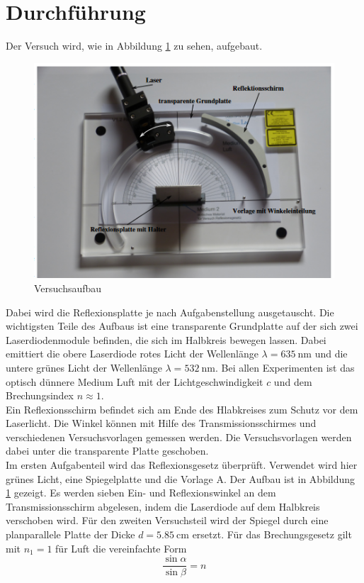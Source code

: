 \section{Durchführung}
\label{sec:Durchführung}
Der Versuch wird, wie in Abbildung \ref{fig:aufb} zu sehen, aufgebaut.
\begin{figure}
    \centering
    \caption{Versuchsaufbau \cite{V400}}
    \label{fig:aufb}
    \includegraphics[width = 0.6 \textwidth]{pics/aufb.png}
\end{figure}
Dabei wird die Reflexionsplatte je nach Aufgabenstellung ausgetauscht.
Die wichtigsten Teile des Aufbaus ist eine transparente Grundplatte auf der sich zwei Laserdiodenmodule befinden, die sich im Halbkreis bewegen lassen.
Dabei emittiert die obere Laserdiode rotes Licht der Wellenlänge $\lambda = \SI{635}{\nano \meter}$ und die untere grünes Licht der Wellenlänge $\lambda=\SI{532}{\nano \meter}$.
Bei allen Experimenten ist das optisch dünnere Medium Luft mit der Lichtgeschwindigkeit $c$ und dem Brechungsindex $n \approx 1$.\\
Ein Reflexionsschirm befindet sich am Ende des Hlabkreises zum Schutz vor dem Laserlicht. Die Winkel können mit Hilfe des Transmissionsschirmes und verschiedenen Versuchsvorlagen gemessen werden.
Die Versuchsvorlagen werden dabei unter die transparente Platte geschoben.\\
Im ersten Aufgabenteil wird das Reflexionsgesetz überprüft. Verwendet wird hier grünes Licht, eine Spiegelplatte und die Vorlage A.
Der Aufbau ist in Abbildung \ref{fig:aufb} gezeigt. Es werden sieben Ein- und Reflexionswinkel an dem Transmissionsschirm abgelesen, indem die Laserdiode auf dem Halbkreis verschoben wird.
Für den zweiten Versuchsteil wird der Spiegel durch eine planparallele Platte der Dicke $d=\SI{5.85}{\centi\metre}$ ersetzt. Für das Brechungsgesetz gilt mit $n_1=1$ für Luft die vereinfachte Form
\begin{equation}
    \frac{\sin \alpha}{\sin \beta} = n
\end{equation}
